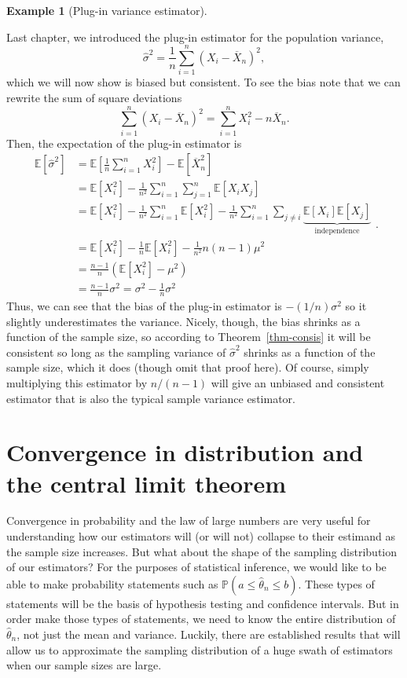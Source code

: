 \documentclass[
  letterpaper,
  DIV=11,
  numbers=noendperiod]{scrreprt}
\newcommand{\E}{\mathbb{E}}
\renewcommand{\P}{\mathbb{P}}
\newcommand{\Xbar}{\overline{X}}
\theoremstyle{definition}
\theoremstyle{plain}
\theoremstyle{definition}
\newtheorem{example}{Example}[chapter]
\theoremstyle{remark}
\begin{document}
\leavevmode{}%
\begin{example}[Plug-in variance estimator]\label{exm-plug-in-variance}

Last chapter, we introduced the plug-in estimator for the population
variance, \[
\widehat{\sigma}^2 = \frac{1}{n} \sum_{i=1}^n (X_i - \Xbar_n)^2,
\] which we will now show is biased but consistent. To see the bias note
that we can rewrite the sum of square deviations
\[\sum_{i=1}^n (X_i - \Xbar_n)^2 = \sum_{i=1}^n X_i^2 - n\Xbar_n. \]
Then, the expectation of the plug-in estimator is \[
\begin{aligned}
\E[\widehat{\sigma}^2] & = \E\left[\frac{1}{n}\sum_{i=1}^n X_i^2\right] - \E[\Xbar_n^2] \\
&= \E[X_i^2] - \frac{1}{n^2}\sum_{i=1}^n \sum_{j=1}^n \E[X_iX_j] \\
&= \E[X_i^2] - \frac{1}{n^2}\sum_{i=1}^n \E[X_i^2] - \frac{1}{n^2}\sum_{i=1}^n \sum_{j\neq i} \underbrace{\E[X_i]\E[X_j]}_{\text{independence}} \\
&= \E[X_i^2] - \frac{1}{n}\E[X_i^2] - \frac{1}{n^2} n(n-1)\mu^2 \\
&= \frac{n-1}{n} \left(\E[X_i^2] - \mu^2\right) \\
&= \frac{n-1}{n} \sigma^2 = \sigma^2 - \frac{1}{n}\sigma^2
\end{aligned}. 
\] Thus, we can see that the bias of the plug-in estimator is
\(-(1/n)\sigma^2\) so it slightly underestimates the variance. Nicely,
though, the bias shrinks as a function of the sample size, so according
to Theorem~\ref{thm-consis} it will be consistent so long as the
sampling variance of \(\widehat{\sigma}^2\) shrinks as a function of the
sample size, which it does (though omit that proof here). Of course,
simply multiplying this estimator by \(n/(n-1)\) will give an unbiased
and consistent estimator that is also the typical sample variance
estimator.

\end{example}

\hypertarget{convergence-in-distribution-and-the-central-limit-theorem}{%
\section{Convergence in distribution and the central limit
theorem}\label{convergence-in-distribution-and-the-central-limit-theorem}}

Convergence in probability and the law of large numbers are very useful
for understanding how our estimators will (or will not) collapse to
their estimand as the sample size increases. But what about the shape of
the sampling distribution of our estimators? For the purposes of
statistical inference, we would like to be able to make probability
statements such as \(\P(a \leq \widehat{\theta}_n \leq b)\). These types
of statements will be the basis of hypothesis testing and confidence
intervals. But in order make those types of statements, we need to know
the entire distribution of \(\widehat{\theta}_n\), not just the mean and
variance. Luckily, there are established results that will allow us to
approximate the sampling distribution of a huge swath of estimators when
our sample sizes are large.
\end{document}
